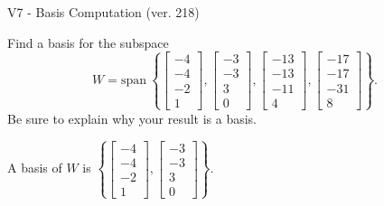 \begin{exercise}
  \begin{exerciseTitle}V7 - Basis Computation (ver. 218)\end{exerciseTitle}
  \begin{exerciseStatement}
    Find a basis for the subspace 
\[W=\mathrm{span}\ \left\{\left[\begin{array}{r}
-4 \\
-4 \\
-2 \\
1
\end{array}\right] , \left[\begin{array}{r}
-3 \\
-3 \\
3 \\
0
\end{array}\right] , \left[\begin{array}{r}
-13 \\
-13 \\
-11 \\
4
\end{array}\right] , \left[\begin{array}{r}
-17 \\
-17 \\
-31 \\
8
\end{array}\right]\right\}.\]
 Be sure to explain why your result is a basis.


  \end{exerciseStatement}
  \begin{exerciseAnswer}
   A basis of \(W\) is  \(\left\{\left[\begin{array}{r}
-4 \\
-4 \\
-2 \\
1
\end{array}\right] , \left[\begin{array}{r}
-3 \\
-3 \\
3 \\
0
\end{array}\right]\right\}\).
  


  \end{exerciseAnswer}
\end{exercise}